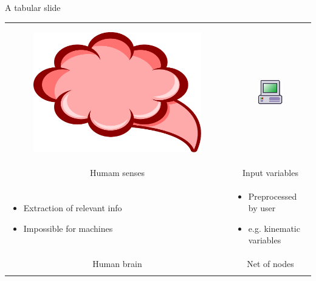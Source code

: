 \documentclass{beamer}
\begin{document}
\begin{frame}{A tabular slide}
    \begin{tabular}{p{5cm}|p{5cm}}
        \begin{figure}
            \includegraphics[scale = 0.09]{brain}
        \end{figure}
        & 
        \begin{figure}
            \includegraphics[scale = 1.4]{machine}
        \end{figure} \\
      \multicolumn{1}{c|}{Humam senses} & \multicolumn{1}{c}{Input variables} \\
        \begin{itemize}
            \item Extraction of relevant info
            \item Impossible for machines
        \end{itemize}
        & 
        \begin{itemize}
          \item Preprocessed by user
          \item {e.g.} kinematic variables
        \end{itemize} \\
    \multicolumn{1}{c|}{Human brain} & \multicolumn{1}{c}{Net of nodes} \\
        \begin{itemize}

\end{itemize}
\end{tabular}
\end{frame}
\end{document}
